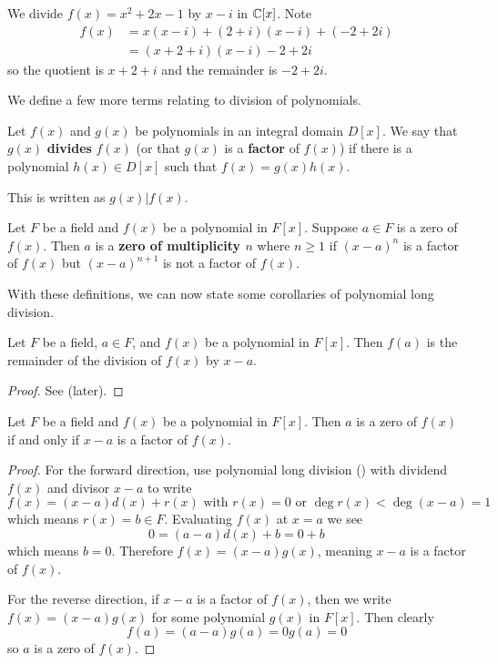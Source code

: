 \begin{example}
    We divide $f(x) = x^2 + 2x - 1$ by $x-i$ in $\mathbb{C}[x]$. Note
    \begin{align*}
        f(x) &= x(x-i) + (2+i)(x-i) + (-2+2i)\\
        &= (x+2+i)(x-i) - 2 + 2i
    \end{align*}
    so the quotient is $x+2+i$ and the remainder is $-2+2i$.
\end{example}

We define a few more terms relating to division of polynomials.
\begin{definition}
    Let $f(x)$ and $g(x)$ be polynomials in an integral domain $D[x]$. We say that $g(x)$ \textbf{divides} $f(x)$ (or that $g(x)$ is a \textbf{factor} of $f(x)$) if there is a polynomial $h(x) \in D[x]$ such that $f(x) = g(x)h(x)$.

    This is written as $g(x) \vert f(x)$.
\end{definition}
\begin{definition}
    Let $F$ be a field and $f(x)$ be a polynomial in $F[x]$. Suppose $a \in F$ is a zero of $f(x)$. Then $a$ is a \textbf{zero of multiplicity $n$} where $n \geq 1$ if $(x-a)^n$ is a factor of $f(x)$ but $(x-a)^{n+1}$ is not a factor of $f(x)$.
\end{definition}

With these definitions, we can now state some corollaries of polynomial long division.

\begin{corollary}\label{corollary-remainder-theorem}
    Let $F$ be a field, $a \in F$, and $f(x)$ be a polynomial in $F[x]$. Then $f(a)$ is the remainder of the division of $f(x)$ by $x-a$.
\end{corollary}
\begin{proof}
    See  (later).
\end{proof}

\begin{corollary}\label{corollary-factor-theorem}
    Let $F$ be a field and $f(x)$ be a polynomial in $F[x]$. Then $a$ is a zero of $f(x)$ if and only if $x-a$ is a factor of $f(x)$.
\end{corollary}
\begin{proof}
    For the forward direction, use polynomial long division () with dividend $f(x)$ and divisor $x-a$ to write
    \[
        f(x) = (x-a)d(x) + r(x) \text{ with } r(x) = 0 \text{ or } \deg r(x) < \deg(x-a) = 1
    \]
    which means $r(x) = b \in F$. Evaluating $f(x)$ at $x = a$ we see
    \[
        0 = (a-a)d(x) + b = 0 + b
    \]
    which means $b = 0$. Therefore $f(x) = (x-a)g(x)$, meaning $x-a$ is a factor of $f(x)$.

    For the reverse direction, if $x - a$ is a factor of $f(x)$, then we write $f(x) = (x-a)g(x)$ for some polynomial $g(x)$ in $F[x]$. Then clearly
    \[
        f(a) = (a-a)g(a) = 0g(a) = 0
    \]
    so $a$ is a zero of $f(x)$.
\end{proof}

